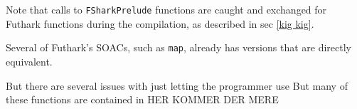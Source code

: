 Note that calls to \texttt{FSharkPrelude} functions are caught and exchanged for
Futhark functions during the \fshark{} compilation, as described in sec \ref{kig
  kig}.



Several of Futhark's SOACs, such as \texttt{map}, already has \fsharp{}
versions that are directly equivalent.

But there are several issues with just letting the \fshark{} programmer use 
But many of these \fsharp{} functions are
contained in 
HER KOMMER DER MERE











